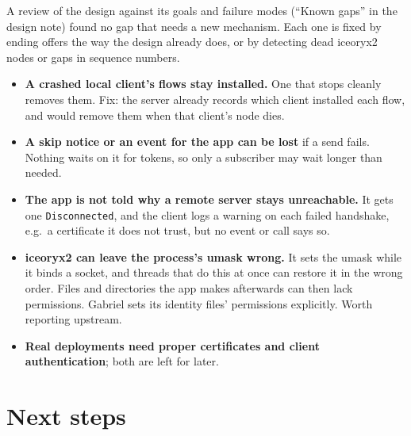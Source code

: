 \documentclass[11pt]{article}
\newcommand{\code}[1]{\texttt{#1}}
\begin{document}
A review of the design against its goals and failure modes (``Known gaps'' in
the design note) found no gap that needs a new mechanism. Each one is fixed by
ending offers the way the design already does, or by detecting dead iceoryx2
nodes or gaps in sequence numbers.
\begin{itemize}[nosep]
  \item \textbf{A crashed local client's flows stay installed.} One that
        stops cleanly removes them. Fix: the server already records which
        client installed each flow, and would remove them when that client's
        node dies.
  \item \textbf{A skip notice or an event for the app can be lost} if a send
        fails. Nothing waits on it for tokens, so only a subscriber may wait
        longer than needed.
  \item \textbf{The app is not told why a remote server stays unreachable.}
        It gets one \code{Disconnected}, and the client logs a warning on
        each failed handshake, e.g.\ a certificate it does not trust, but no
        event or call says so.
  \item \textbf{iceoryx2 can leave the process's umask wrong.} It sets the
        umask while it binds a socket, and threads that do this at once can
        restore it in the wrong order. Files and directories the app makes
        afterwards can then lack permissions. Gabriel sets its identity
        files' permissions explicitly. Worth reporting upstream.
  \item \textbf{Real deployments need proper certificates and client
        authentication}; both are left for later.
\end{itemize}

\section{Next steps}
\end{document}

